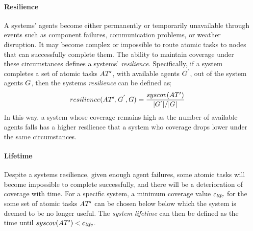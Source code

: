\newcommand{\functionSymbolResilence}[2]{\functionSymbol{resilience}{#1}{#2}}
\newcommand{\functionResilence}[2]{
	\functionSignature{\functionSymbolResilence{#1}{#2}}
	{\setAtomicTaskInstance{}{}, \setAgent{}{'}, \setAgent{}{} }
}
\paragraph{Resilience}
\label{section:resilience}
A systems' agents become either permanently or temporarily unavailable through events such as component failures, communication problems, or weather disruption. It may become complex or impossible to route atomic tasks to nodes that can successfully complete them. The ability to maintain coverage under these circumstances defines a systems' \textit{resilience}. Specifically, if a system completes a set of atomic tasks $\setAtomicTaskInstance{}{}$, with available agents $\setAgent{}{'}$, out of the system agents $\setAgent{}{}$, then the systems \textit{resilience} can be defined as; 
\begin{equation}
	\functionResilence{}{}
	= 
	\frac{
		\functionSystemCoverage{}{}
	}{
		\funcSize{\setAgents{}{'}} / \funcSize{\setAgents{}{}}
	}
\end{equation}
In this way, a system whose coverage remains high as the number of available agents falls has a higher resilience that a system who coverage drops lower under the same circumstances.


 \newcommand{\varCoverageMinimum}[2]{\varSymbol{c}{\textit{life}}{}}
 \paragraph{Lifetime}
 \label{section:lifetime}
 Despite a systems resilience, given enough agent failures, some atomic tasks will become impossible to complete successfully, and there will be a deterioration of coverage with time. For a specific system, a minimum coverage value $\varCoverageMinimum{}{}$ for the some set of atomic tasks $\setAtomicTaskInstance{}{}$ can be chosen below below which the system is deemed to be no longer useful. The \textit{system lifetime} can then be defined as the time until $\functionSystemCoverage{}{} < \varCoverageMinimum{}{}$.
 
 

